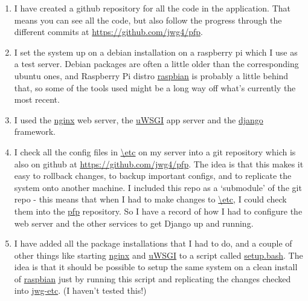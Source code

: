 \documentclass{article}
\begin{document}
\begin{enumerate}
\item
I have created a github repository for all the code in the application. That means you can see all the code, but also follow the progress through the different commits at \url{https://github.com/jwg4/pfp}. 
\item
I set the system up on a debian installation on a raspberry pi which I use as a test server. Debian packages are often a little older than the corresponding ubuntu ones, and Raspberry Pi distro \url{raspbian} is probably a little behind that, so some of the tools used might be a long way off what's currently the most recent.
\item 
I used the \url{nginx} web server, the \url{uWSGI} app server and the \url{django} framework.
\item
I check all the config files in \url{\etc} on my server into a git repository which is also on github at \url{https://github.com/jwg4/pfp}. The idea is that this makes it easy to rollback changes, to backup important configs, and to replicate the system onto another machine. I included this repo as a `submodule' of the git repo - this means that when I had to make changes to \url{\etc}, I could check them into the \url{pfp} repository. So I have a record of how I had to configure the web server and the other services to get Django up and running.  
\item
I have added all the package installations that I had to do, and a couple of other things like starting \url{nginx} and \url{uWSGI} to a script called \url{setup.bash}. The idea is that it should be possible to setup the same system on a clean install of \url{raspbian} just by running this script and replicating the changes checked into \url{jwg-etc}. (I haven't tested this!)   
\end{enumerate}
\end{document}
